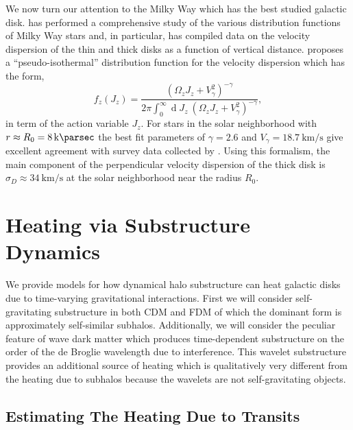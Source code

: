 \documentclass[usenatbib]{mnras}
\renewcommand{\d}[1]{\! \mathrm{d}#1 \:}
\renewcommand{\d}[1]{\ensuremath{\operatorname{d}\!{#1}}}
\begin{document}
\par
We now turn our attention to the Milky Way which has the best studied galactic disk. \cite{milky_way} has performed a comprehensive study of the various distribution functions of Milky Way stars and, in particular, has compiled data on the velocity dispersion of the thin and thick disks as a function of vertical distance. \cite{milky_way} proposes a ``pseudo-isothermal'' distribution function for the velocity dispersion which has the form,
\begin{equation}
f_z(J_z) = \frac{\left( \Omega_z J_z + V_\gamma^2 \right)^{-\gamma}}{2 \pi \int_{0}^{\infty} \d{J_z} \: \left( \Omega_z J_z + V_\gamma^2 \right)^{-\gamma} },
\end{equation}  
in term of the action variable $J_z$. For stars in the solar neighborhood with $r \approx R_0 =  \SI{8}{\kilo \parsec}$ the best fit parameters of $\gamma = 2.6$ and $V_\gamma = \SI{18.7}{\kilo \meter \per \second}$ give excellent agreement with survey data collected by \cite{milkyway-thickdisk}. Using this formalism, the main component of the perpendicular velocity dispersion of the thick disk is $\sigma_D \approx \SI{34}{\kilo \meter \per \second}$ at the solar neighborhood near the radius $R_0$.   



\section{Heating via Substructure Dynamics}

We provide models for how dynamical halo substructure can heat galactic disks due to time-varying gravitational interactions. First we will consider self-gravitating substructure in both CDM and FDM of which the dominant form is approximately self-similar subhalos. Additionally, we will consider the peculiar feature of wave dark matter which produces time-dependent substructure on the order of the de Broglie wavelength due to interference. This wavelet substructure provides an additional source of heating which is qualitatively very different from the heating due to subhalos because the wavelets are not self-gravitating objects. 

\subsection{Estimating The Heating Due to Transits}
\end{document}
